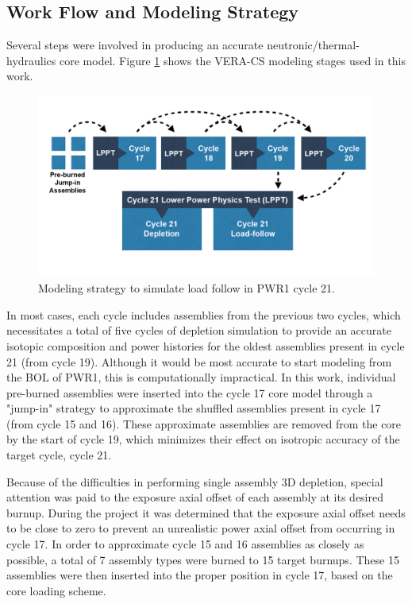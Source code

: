 \documentclass[edeposit,fullpage,11pt]{uiucthesis2009}
\begin{document}
\subsection{Work Flow and Modeling Strategy}

Several steps were involved in producing an accurate neutronic/thermal-hydraulics core model. 
Figure \ref{fig:method} shows the VERA-CS modeling stages used in this work.


\begin{figure}
\begin{center}
\includegraphics[width=0.5\linewidth]{./Figures/method.png}
\end{center}
\caption{Modeling strategy to simulate load follow in PWR1 cycle 21.}
\label{fig:method}
\end{figure} 

In most cases, each cycle includes assemblies from the previous two cycles, which necessitates a total of five cycles of depletion simulation to provide an accurate isotopic composition and power histories for the oldest assemblies present in cycle 21 (from cycle 19). 
Although it would be most accurate to start modeling from the \gls{BOL} of PWR1, this is computationally impractical. 
In this work, individual pre-burned assemblies were inserted into the cycle 17 core model through a "jump-in" strategy to approximate the shuffled assemblies present in cycle 17 (from cycle 15 and 16). 
These approximate assemblies are removed from the core by the start of cycle 19, which minimizes their effect on isotropic accuracy of the target cycle, cycle 21. 

Because of the difficulties in performing single assembly 3D depletion, special attention was paid to the exposure axial offset of each assembly at its desired burnup. 
During the project it was determined that the exposure axial offset needs to be close to zero to prevent an unrealistic power axial offset from occurring in cycle 17. 
In order to approximate cycle 15 and 16 assemblies as closely as possible, a total of 7 assembly types were burned to 15 target burnups. 
These 15 assemblies were then inserted into the proper position in cycle 17, based on the core loading scheme.
\end{document}
